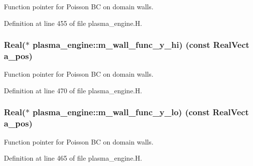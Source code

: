 Function pointer for Poisson BC on domain walls. 



Definition at line 455 of file plasma\+\_\+engine.\+H.

\subsubsection[{\texorpdfstring{m\+\_\+wall\+\_\+func\+\_\+y\+\_\+hi}{m_wall_func_y_hi}}]{\setlength{\rightskip}{0pt plus 5cm}Real($\ast$ plasma\+\_\+engine\+::m\+\_\+wall\+\_\+func\+\_\+y\+\_\+hi) (const Real\+Vect a\+\_\+pos)\hspace{0.3cm}{\ttfamily [protected]}}\hypertarget{classplasma__engine_a6378af218871a41120b3ffd3b13b13eb}{}\label{classplasma__engine_a6378af218871a41120b3ffd3b13b13eb}


Function pointer for Poisson BC on domain walls. 



Definition at line 470 of file plasma\+\_\+engine.\+H.

\subsubsection[{\texorpdfstring{m\+\_\+wall\+\_\+func\+\_\+y\+\_\+lo}{m_wall_func_y_lo}}]{\setlength{\rightskip}{0pt plus 5cm}Real($\ast$ plasma\+\_\+engine\+::m\+\_\+wall\+\_\+func\+\_\+y\+\_\+lo) (const Real\+Vect a\+\_\+pos)\hspace{0.3cm}{\ttfamily [protected]}}\hypertarget{classplasma__engine_a738cb5077366493ba56b7e5f7359d695}{}\label{classplasma__engine_a738cb5077366493ba56b7e5f7359d695}


Function pointer for Poisson BC on domain walls. 



Definition at line 465 of file plasma\+\_\+engine.\+H.

